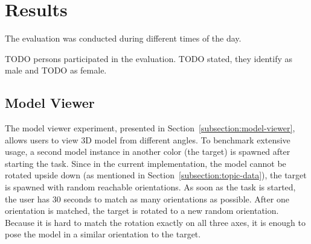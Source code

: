 \section{Results}\label{section:eval-results}

The evaluation was conducted during different times of the day. %


TODO persons participated in the evaluation. TODO stated, they identify as male and TODO as female. 

\subsection{Model Viewer}\label{section:eval-res-mv}

The model viewer experiment, presented in Section~\ref{subsection:model-viewer}, allows users to view \ac{3D} model from different angles. To benchmark extensive usage, a second model instance in another color (the target) is spawned after starting the task. Since in the current implementation, the model cannot be rotated upside down (as mentioned in Section~\ref{subsection:topic-data}), the target is spawned with random reachable orientations.
As soon as the task is started, the user has 30 seconds to match as many orientations as possible. After one orientation is matched, the target is rotated to a new random orientation.
Because it is hard to match the rotation exactly on all three axes, it is enough to pose the model in a similar orientation to the target.

